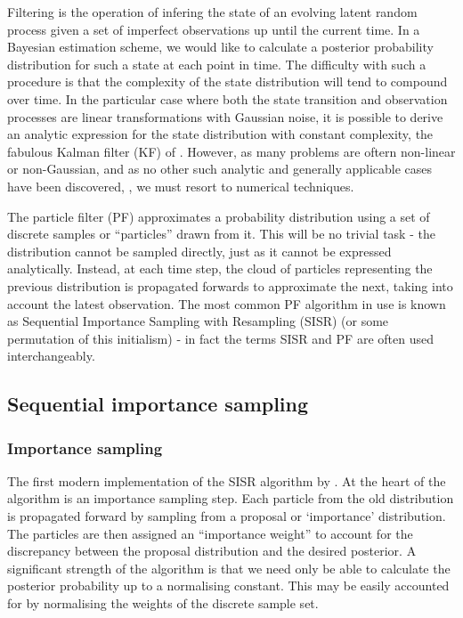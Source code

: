 Filtering is the operation of infering the state of an evolving latent random process given a set of imperfect observations up until the current time. In a Bayesian estimation scheme, we would like to calculate a posterior probability distribution for such a state at each point in time. The difficulty with such a procedure is that the complexity of the state distribution will tend to compound over time. In the particular case where both the state transition and observation processes are linear transformations with Gaussian noise, it is possible to derive an analytic expression for the state distribution with constant complexity, the fabulous Kalman filter (KF) of \cite{Kalman1960}. However, as many problems are oftern non-linear or non-Gaussian, and as no other such analytic and generally applicable cases have been discovered, \cite{Daum2005}, we must resort to numerical techniques.

The particle filter (PF) approximates a probability distribution using a set of discrete samples or ``particles'' drawn from it. This will be no trivial task - the distribution cannot be sampled directly, just as it cannot be expressed analytically. Instead, at each time step, the cloud of particles representing the previous distribution is propagated forwards to approximate the next, taking into account the latest observation. The most common PF algorithm in use is known as Sequential Importance Sampling with Resampling (SISR) (or some permutation of this initialism) - in fact the terms SISR and PF are often used interchangeably.

\subsection{Sequential importance sampling}

\subsubsection{Importance sampling}
The first modern implementation of the SISR algorithm by \cite{Gordon1993}. At the heart of the algorithm is an importance sampling step. Each particle from the old distribution is propagated forward by sampling from a proposal or `importance' distribution. The particles are then assigned an ``importance weight'' to account for the discrepancy between the proposal distribution and the desired posterior. A significant strength of the algorithm is that we need only be able to calculate the posterior probability up to a normalising constant. This may be easily accounted for by normalising the weights of the discrete sample set.

